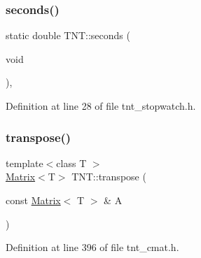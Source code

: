 \subsubsection{\texorpdfstring{seconds()}{seconds()}}
{\footnotesize\ttfamily static double T\+N\+T\+::seconds (\begin{DoxyParamCaption}\item[{void}]{ }\end{DoxyParamCaption})\hspace{0.3cm}{\ttfamily [inline]}, {\ttfamily [static]}}



Definition at line 28 of file tnt\+\_\+stopwatch.\+h.

\mbox{\label{namespaceTNT_ab22c518de961e96e4a654ce4b4c6b948}} 
\subsubsection{\texorpdfstring{transpose()}{transpose()}}
{\footnotesize\ttfamily template$<$class T $>$ \\
\hyperlink{classTNT_1_1Matrix}{Matrix}$<$T$>$ T\+N\+T\+::transpose (\begin{DoxyParamCaption}\item[{const \hyperlink{classTNT_1_1Matrix}{Matrix}$<$ T $>$ \&}]{A }\end{DoxyParamCaption})}



Definition at line 396 of file tnt\+\_\+cmat.\+h.


